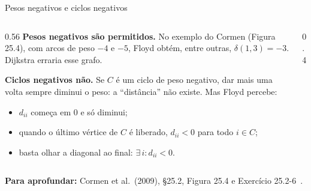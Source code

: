 \documentclass[aspectratio=169,xcolor=table]{beamer}
\newcommand{\fonte}[1]{%
  \vfill
  {\tiny\color{gray!55!black}\textbf{Para aprofundar:} #1\par}%
}
\begin{document}
\begin{frame}{Pesos negativos e ciclos negativos}
  \begin{columns}[c]
    \begin{column}{0.56\textwidth}
      \scriptsize\textbf{Pesos negativos são permitidos.} No exemplo do Cormen (Figura 25.4),
      com arcos de peso $-4$ e $-5$, Floyd obtém, entre outras, $\delta(1,3) = -3$. Dijkstra
      erraria esse grafo.
      \medskip

      \textbf{Ciclos negativos não.} Se $C$ é um ciclo de peso negativo, dar mais uma volta
      sempre diminui o peso: a ``distância'' não existe. Mas Floyd percebe:
      \begin{itemize}\scriptsize
        \item $d_{ii}$ começa em $0$ e só diminui;
        \item quando o último vértice de $C$ é liberado, $d_{ii} < 0$ para todo $i \in C$;
        \item basta olhar a diagonal ao final: $\exists\, i: d_{ii} < 0$.
      \end{itemize}
    \end{column}
    \begin{column}{0.4\textwidth}
      \centering
    \end{column}
  \end{columns}
  \fonte{Cormen et al.\ (2009), \S 25.2, Figura 25.4 e Exercício
    25.2-6~\cite{cormen2009introduction}.}
\end{frame}
\end{document}
